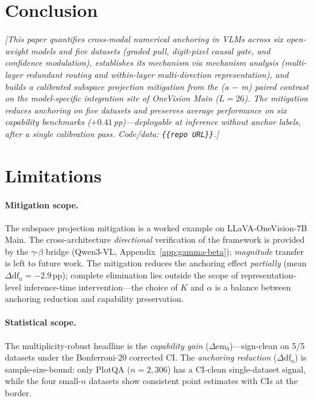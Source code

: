 \documentclass[11pt]{article}
\newcommand{\todoNote}[1]{\textit{\textcolor[rgb]{0.45,0.45,0.45}{[#1]}}}
\begin{document}
\section{Conclusion}
\todoNote{This paper quantifies \textit{cross-modal numerical anchoring} in VLMs across six open-weight models and five datasets (graded pull, digit-pixel causal gate, and confidence modulation), establishes its mechanism via mechanism analysis (\textit{multi-layer redundant routing and within-layer multi-direction representation}), and builds a \textit{calibrated subspace projection} mitigation from the (a $-$ m) paired contrast on the model-specific integration site of OneVision Main ($L=26$). The mitigation reduces anchoring on five datasets and preserves average performance on six capability benchmarks ($+0.41$\,pp)---deployable at inference \textit{without anchor labels}, after a single calibration pass. Code/data: \texttt{\{\{repo URL\}\}}.}

\section*{Limitations}
\paragraph{Mitigation scope.}
The subspace projection mitigation is a worked example on LLaVA-OneVision-7B Main. The cross-architecture \textit{directional} verification of the framework is provided by the $\gamma$-$\beta$ bridge (Qwen3-VL, Appendix~\ref{app:gamma-beta}); \textit{magnitude} transfer is left to future work. The mitigation reduces the anchoring effect \textit{partially} (mean $\Delta \mathrm{df}_a = -2.9$\,pp); complete elimination lies outside the scope of representation-level inference-time intervention---the choice of $K$ and $\alpha$ is a balance between anchoring reduction and capability preservation.

\paragraph{Statistical scope.}
The multiplicity-robust headline is the \textit{capability gain} ($\Delta \mathrm{em}_b$)---sign-clean on 5/5 datasets under the Bonferroni-20 corrected CI. The \textit{anchoring reduction} ($\Delta \mathrm{df}_a$) is sample-size-bound: only PlotQA ($n=2{,}306$) has a CI-clean single-dataset signal, while the four small-$n$ datasets show consistent point estimates with CIs at the border.
\end{document}
